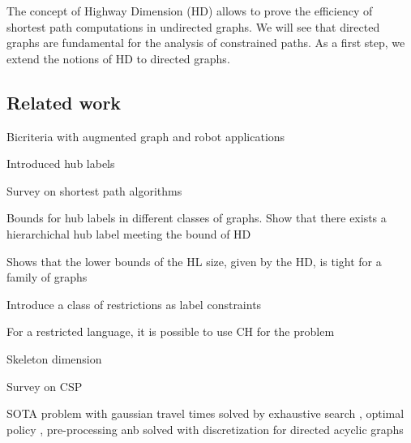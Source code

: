The concept of Highway Dimension (HD) \cite{highway2010,highway2013} allows to prove the efficiency of shortest path computations in undirected graphs.
We will see that directed graphs are fundamental for the analysis of constrained paths.
As a first step, we extend the notions of HD to directed graphs.

\subsection{Related work}

Bicriteria with augmented graph and robot applications \cite{alex_bicriteria}

Introduced hub labels\cite{cohen_definition_hl}

Survey on shortest path algorithms \cite{goldberg_survey}

Bounds for hub labels in different classes of graphs. 
Show that there exists a hierarchichal hub label meeting the bound of HD \cite{babenko_hl_complexity}

Shows that the lower bounds of the HL size, given by the HD, is tight for a family of graphs \cite{white_complexity_hd}

Introduce a class of restrictions as label constraints \cite{language_csp}

For a restricted language, it is possible to use CH for the problem \cite{rice_csp}

Skeleton dimension \cite{skeleton}

Survey on CSP \cite{csp_survey}

SOTA problem with gaussian travel times solved by exhaustive search \cite{nikolova_gaussian}, optimal policy \cite{samaranayake2012speedup}, pre-processing \cite{sabran2014precomputation} anb solved with discretization for directed acyclic graphs \cite{nikolova_discretization}